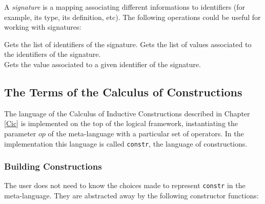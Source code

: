 A \textsl{signature} is a mapping associating different informations
to identifiers (for example, its type, its definition, etc). The
following operations could be useful for working with signatures:

\begin{description}
    {Gets the list of identifiers of the signature.}
    {Gets the list of values associated to the identifiers of the signature.}
    {\\ Gets the value associated to a given identifier of the signature.}
\end{description}


\subsection{The Terms of the Calculus of Constructions}

The language of the Calculus of Inductive Constructions described in
Chapter \ref{Cic} is implemented on the top of the logical framework,
instantiating the parameter $op$ of the meta-language with a
particular set of operators.  In the implementation this language is
called \texttt{constr}, the language of constructions.


\subsubsection{Building Constructions}

The user does not need to know the choices made to represent
\texttt{constr} in the meta-language. They are abstracted away by the
following constructor functions:

